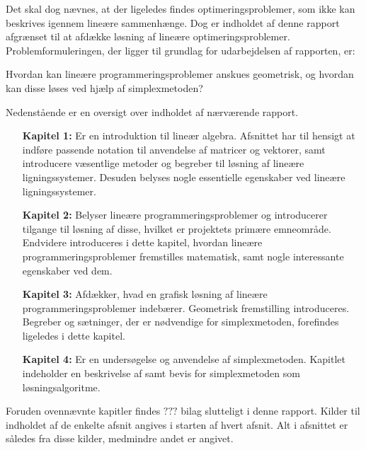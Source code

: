 Det skal dog nævnes, at der ligeledes findes optimeringsproblemer, som ikke kan beskrives igennem lineære sammenhænge. 
Dog er indholdet af denne rapport afgrænset til at afdække løsning af lineære optimeringsproblemer.
%
Problemformuleringen, der ligger til grundlag for udarbejdelsen af rapporten, er: 
%
\begin{col}{}{}
Hvordan kan lineære programmeringsproblemer anskues geometrisk, og hvordan kan disse løses ved hjælp af simplexmetoden?
\end{col}
% 
\noindent
%
Nedenstående er en oversigt over indholdet af nærværende rapport. 
\begin{itemize}[itemindent=4.6em]
\item[\textbf{Kapitel 1:}] Er en introduktion til lineær algebra.
Afsnittet har til hensigt at indføre passende notation til anvendelse af matricer og vektorer, samt introducere væsentlige metoder og begreber til løsning af lineære ligningssystemer. 
Desuden belyses nogle essentielle egenskaber ved lineære ligningssystemer. 
\item[\textbf{Kapitel 2:}] Belyser lineære programmeringsproblemer og introducerer tilgange til løsning af disse, hvilket er projektets primære emneområde. 
Endvidere introduceres i dette kapitel, hvordan lineære programmeringsproblemer fremstilles matematisk, samt nogle interessante egenskaber ved dem. 
\item[\textbf{Kapitel 3:}] Afdækker, hvad en grafisk løsning af lineære programmeringsproblemer indebærer. 
Geometrisk fremstilling introduceres. 
Begreber og sætninger, der er nødvendige for simplexmetoden, forefindes ligeledes i dette kapitel. 
\item[\textbf{Kapitel 4:}] Er en undersøgelse og anvendelse af simplexmetoden. 
Kapitlet indeholder en beskrivelse af samt bevis for simplexmetoden som løsningsalgoritme.
\end{itemize}
%
Foruden ovennævnte kapitler findes $???$ bilag slutteligt i denne rapport.
Kilder til indholdet af de enkelte afsnit angives i starten af hvert afsnit. 
Alt i afsnittet er således fra disse kilder, medmindre andet er angivet. 